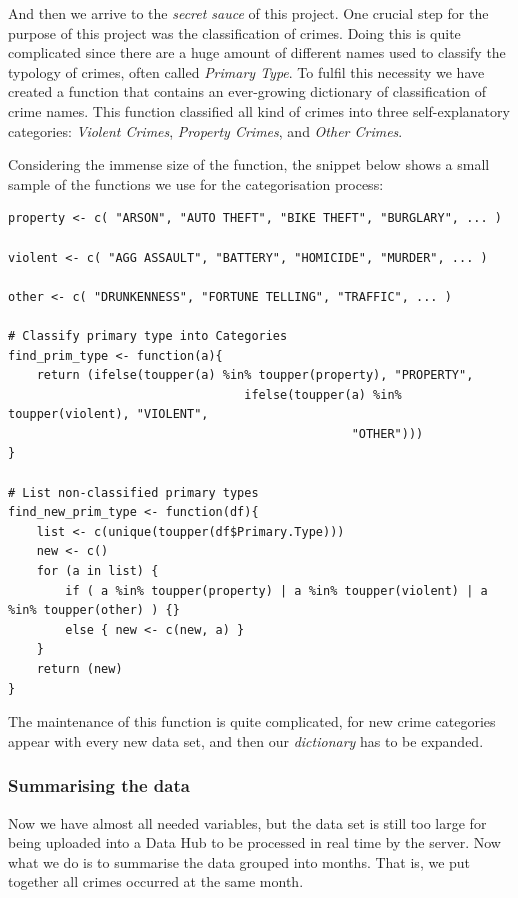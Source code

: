 And then we arrive to the \emph{secret sauce} of this project. One crucial step for the purpose of this project was the classification of crimes. Doing this is quite complicated since there are a huge amount of different names used to classify the typology of crimes, often called \emph{Primary Type}. To fulfil this necessity we have created a function that contains an ever-growing dictionary of classification of crime names. This function classified all kind of crimes into three self-explanatory categories: \emph{Violent Crimes}, \emph{Property Crimes}, and \emph{Other Crimes}.

Considering the immense size of the function, the snippet below shows a small sample of the functions we use for the categorisation process:
\begin{lstlisting}[label=sn:prim_types, caption=Simplified structure of \inline{prim_types_functions.R}]
property <- c( "ARSON", "AUTO THEFT", "BIKE THEFT", "BURGLARY", ... )

violent <- c( "AGG ASSAULT", "BATTERY", "HOMICIDE", "MURDER", ... )

other <- c( "DRUNKENNESS", "FORTUNE TELLING", "TRAFFIC", ... )

# Classify primary type into Categories
find_prim_type <- function(a){
	return (ifelse(toupper(a) %in% toupper(property), "PROPERTY",
								 ifelse(toupper(a) %in% toupper(violent), "VIOLENT",
												"OTHER")))
}

# List non-classified primary types
find_new_prim_type <- function(df){
	list <- c(unique(toupper(df$Primary.Type)))
	new <- c()
	for (a in list) {
		if ( a %in% toupper(property) | a %in% toupper(violent) | a %in% toupper(other) ) {}
		else { new <- c(new, a) }
	}
	return (new)
}
\end{lstlisting}

The maintenance of this function is quite complicated, for new crime categories appear with every new data set, and then our \emph{dictionary} has to be expanded.

\subsubsection*{Summarising the data}

Now we have almost all needed variables, but the data set is still too large for being uploaded into a Data Hub to be processed in real time by the server. Now what we do is to summarise the data grouped into months. That is, we put together all crimes occurred at the same month.

